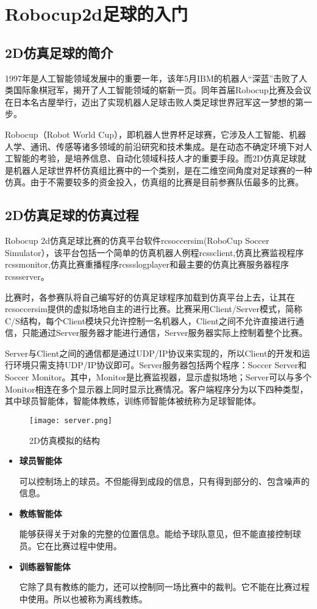 \chapter{Robocup2d足球的入门}
\section{2D仿真足球的简介}
1997年是人工智能领域发展中的重要一年，该年5月IBM的机器人“深蓝”击败了人类国际象棋冠军，揭开了人工智能领域的崭新一页。同年首届Robocup比赛及会议在日本名古屋举行，迈出了实现机器人足球击败人类足球世界冠军这一梦想的第一步。

Robocup（Robot World Cup），即机器人世界杯足球赛，它涉及人工智能、机器人学、通讯、传感等诸多领域的前沿研究和技术集成。是在动态不确定环境下对人工智能的考验，是培养信息、自动化领域科技人才的重要手段。而2D仿真足球就是机器人足球世界杯仿真组比赛中的一个类别，是在二维空间角度对足球赛的一种仿真。由于不需要较多的资金投入，仿真组的比赛是目前参赛队伍最多的比赛。



\section{2D仿真足球的仿真过程}
Robocup 2d仿真足球比赛的仿真平台软件rcsoccersim(RoboCup Soccer Simulator），该平台包括一个简单的仿真机器人例程rcssclient,仿真比赛监视程序rcssmonitor,仿真比赛重播程序rcssslogplayer和最主要的仿真比赛服务器程序rcssserver。

比赛时，各参赛队将自己编写好的仿真足球程序加载到仿真平台上去，让其在rcsoccersim提供的虚拟场地自主的进行比赛。比赛采用Client/Server模式，简称C/S结构，每个Client模块只允许控制一名机器人，Client之间不允许直接进行通信，只能通过Server服务器才能进行通信，Server服务器实际上控制着整个比赛。

Server与Client之间的通信都是通过UDP/IP协议来实现的，所以Client的开发和运行环境只需支持UDP/IP协议即可。Server服务器包括两个程序：Soccer Server和Soccer Monitor。其中，Monitor是比赛监视器，显示虚拟场地；Server可以与多个Monitor相连在多个显示器上同时显示比赛情况。客户端程序分为以下四种类型，其中球员智能体，智能体教练，训练师智能体被统称为足球智能体。
\begin{figure}[H]
	\centering \texttt{[image: server.png]}
	\caption{2D仿真模拟的结构}
\end{figure}

\begin{itemize}
	\item \textbf{球员智能体}
	
	可以控制场上的球员。不但能得到成段的信息，只有得到部分的、包含噪声的信息。
	\item \textbf{教练智能体}
	
	能够获得关于对象的完整的位置信息。能给予球队意见，但不能直接控制球员。它在比赛过程中使用。
	\item \textbf{训练器智能体}
	
	它除了具有教练的能力，还可以控制同一场比赛中的裁判。它不能在比赛过程中使用。所以也被称为离线教练。
\end{itemize}
